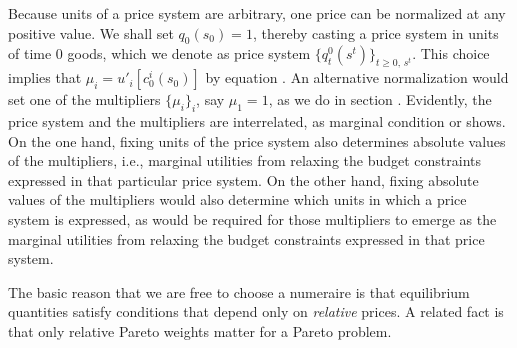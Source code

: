   Because  units of a
price system are arbitrary, one price
can be  normalized
at any positive value.  We shall set $q_0(s_0)= 1$,
thereby casting a  price system in units of time $0$
  goods, which we denote as price system
$\{q^0_t(s^t)\}_{t\geq0,\,s^t}$.
This choice implies that
 $\mu_i  =  u'_i[c_0^i(s_0)] $ by equation .
An alternative  normalization would set  one of the
multipliers $\{\mu_i\}_i$, say $\mu_1=1$, as
we do 
in section . Evidently, the price 
system and the multipliers are interrelated,
as  marginal condition  
or  shows. On the one hand, fixing 
units of the price system also determines  
absolute values of the multipliers, i.e., 
marginal utilities from relaxing the budget
constraints expressed in that particular price 
system. On the other hand, fixing 
absolute values of the multipliers would 
also determine  which units in which a  price system is 
expressed, as would be required for those multipliers to 
emerge as the marginal utilities from relaxing 
the budget constraints expressed in that
price system. 


The basic reason that we are free to choose a numeraire is that equilibrium quantities satisfy conditions that depend only  on {\it relative}
prices.  A related fact is that   only relative Pareto
weights matter for a Pareto problem.




